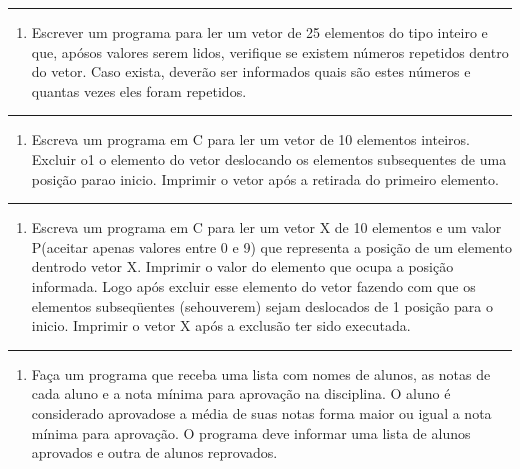 \documentclass[12pt,a4paper]{article}
\providecommand{\tightlist}{%
      \setlength{\itemsep}{0pt}\setlength{\parskip}{0pt}}
\begin{document}
    \begin{center}\rule{0.5\linewidth}{0.5pt}\end{center}

\begin{enumerate}
\def\labelenumi{\arabic{enumi}.}
\setcounter{enumi}{17}
\tightlist
\item
  Escrever um programa para ler um vetor de 25 elementos do tipo inteiro
  e que, apósos valores serem lidos, verifique se existem números
  repetidos dentro do vetor. Caso exista, deverão ser informados quais
  são estes números e quantas vezes eles foram repetidos.
\end{enumerate}

    \begin{center}\rule{0.5\linewidth}{0.5pt}\end{center}

\begin{enumerate}
\def\labelenumi{\arabic{enumi}.}
\setcounter{enumi}{18}
\tightlist
\item
  Escreva um programa em C para ler um vetor de 10 elementos inteiros.
  Excluir o1 o elemento do vetor deslocando os elementos subsequentes de
  uma posição parao inicio. Imprimir o vetor após a retirada do primeiro
  elemento.
\end{enumerate}

    \begin{center}\rule{0.5\linewidth}{0.5pt}\end{center}

\begin{enumerate}
\def\labelenumi{\arabic{enumi}.}
\setcounter{enumi}{19}
\tightlist
\item
  Escreva um programa em C para ler um vetor X de 10 elementos e um
  valor P(aceitar apenas valores entre 0 e 9) que representa a posição
  de um elemento dentrodo vetor X. Imprimir o valor do elemento que
  ocupa a posição informada. Logo após excluir esse elemento do vetor
  fazendo com que os elementos subseqüentes (sehouverem) sejam
  deslocados de 1 posição para o inicio. Imprimir o vetor X após a
  exclusão ter sido executada.
\end{enumerate}

    \begin{center}\rule{0.5\linewidth}{0.5pt}\end{center}

\begin{enumerate}
\def\labelenumi{\arabic{enumi}.}
\setcounter{enumi}{20}
\tightlist
\item
  Faça um programa que receba uma lista com nomes de alunos, as notas de
  cada aluno e a nota mínima para aprovação na disciplina. O aluno é
  considerado aprovadose a média de suas notas forma maior ou igual a
  nota mínima para aprovação. O programa deve informar uma lista de
  alunos aprovados e outra de alunos reprovados.
\end{enumerate}
\end{document}
